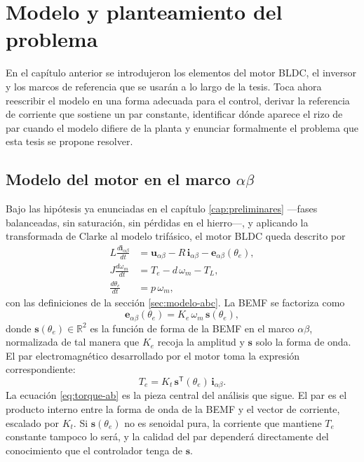 \documentclass[../../../Tesis_JALS_Maestria.tex]{subfiles}
\begin{document}
\chapter{Modelo y planteamiento del problema}
\label{cap:modelo}

En el capítulo anterior se introdujeron los elementos del motor BLDC, el inversor y los marcos de referencia que se usarán a lo largo de la tesis. Toca ahora reescribir el modelo en una forma adecuada para el control, derivar la referencia de corriente que sostiene un par constante, identificar dónde aparece el rizo de par cuando el modelo difiere de la planta y enunciar formalmente el problema que esta tesis se propone resolver.

\section{Modelo del motor en el marco \texorpdfstring{$\alpha\beta$}{alpha-beta}}
\label{sec:modelo-ab-cap3}

Bajo las hipótesis ya enunciadas en el capítulo \ref{cap:preliminares} ---fases balanceadas, sin saturación, sin pérdidas en el hierro---, y aplicando la transformada de Clarke al modelo trifásico, el motor BLDC queda descrito por
\begin{subequations}
\label{eq:modelo-ab-estado}
\begin{align}
    L \frac{d\mathbf{i}_{\alpha\beta}}{dt} &= \mathbf{u}_{\alpha\beta} - R\,\mathbf{i}_{\alpha\beta} - \mathbf{e}_{\alpha\beta}(\theta_e), \label{eq:elec-ab}\\
    J \frac{d\omega_m}{dt} &= T_e - d\,\omega_m - T_L, \label{eq:mec-ab}\\
    \frac{d\theta_e}{dt} &= p\,\omega_m, \label{eq:cin-ab}
\end{align}
\end{subequations}
con las definiciones de la sección \ref{sec:modelo-abc}. La BEMF se factoriza como
\begin{equation}
    \mathbf{e}_{\alpha\beta}(\theta_e) = K_e\,\omega_m\,\mathbf{s}(\theta_e),
    \label{eq:bemf-factorizada}
\end{equation}
donde $\mathbf{s}(\theta_e) \in \mathbb{R}^2$ es la función de forma de la BEMF en el marco $\alpha\beta$, normalizada de tal manera que $K_e$ recoja la amplitud y $\mathbf{s}$ solo la forma de onda. El par electromagnético desarrollado por el motor toma la expresión correspondiente:
\begin{equation}
    T_e = K_t\,\mathbf{s}^{\mathsf T}(\theta_e)\,\mathbf{i}_{\alpha\beta}.
    \label{eq:torque-ab}
\end{equation}
La ecuación \eqref{eq:torque-ab} es la pieza central del análisis que sigue. El par es el producto interno entre la forma de onda de la BEMF y el vector de corriente, escalado por $K_t$. Si $\mathbf{s}(\theta_e)$ no es senoidal pura, la corriente que mantiene $T_e$ constante tampoco lo será, y la calidad del par dependerá directamente del conocimiento que el controlador tenga de $\mathbf{s}$.
\end{document}
